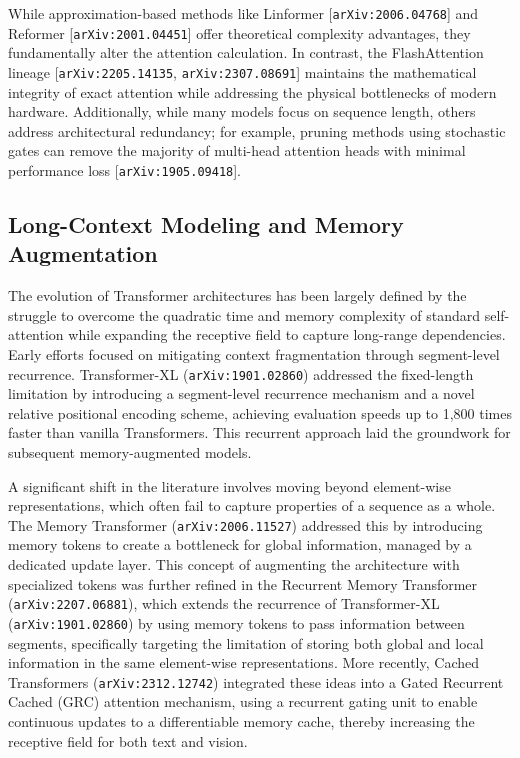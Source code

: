 \documentclass[11pt]{article}
\begin{document}
While approximation-based methods like Linformer [\texttt{arXiv:2006.04768}] and Reformer [\texttt{arXiv:2001.04451}] offer theoretical complexity advantages, they fundamentally alter the attention calculation. In contrast, the FlashAttention lineage [\texttt{arXiv:2205.14135}, \texttt{arXiv:2307.08691}] maintains the mathematical integrity of exact attention while addressing the physical bottlenecks of modern hardware. Additionally, while many models focus on sequence length, others address architectural redundancy; for example, pruning methods using stochastic gates can remove the majority of multi-head attention heads with minimal performance loss [\texttt{arXiv:1905.09418}].

\subsection{Long-Context Modeling and Memory Augmentation}

The evolution of Transformer architectures has been largely defined by the struggle to overcome the quadratic time and memory complexity of standard self-attention while expanding the receptive field to capture long-range dependencies. Early efforts focused on mitigating context fragmentation through segment-level recurrence. Transformer-XL (\texttt{arXiv:1901.02860}) addressed the fixed-length limitation by introducing a segment-level recurrence mechanism and a novel relative positional encoding scheme, achieving evaluation speeds up to 1,800 times faster than vanilla Transformers. This recurrent approach laid the groundwork for subsequent memory-augmented models.

A significant shift in the literature involves moving beyond element-wise representations, which often fail to capture properties of a sequence as a whole. The Memory Transformer (\texttt{arXiv:2006.11527}) addressed this by introducing memory tokens to create a bottleneck for global information, managed by a dedicated update layer. This concept of augmenting the architecture with specialized tokens was further refined in the Recurrent Memory Transformer (\texttt{arXiv:2207.06881}), which extends the recurrence of Transformer-XL (\texttt{arXiv:1901.02860}) by using memory tokens to pass information between segments, specifically targeting the limitation of storing both global and local information in the same element-wise representations. More recently, Cached Transformers (\texttt{arXiv:2312.12742}) integrated these ideas into a Gated Recurrent Cached (GRC) attention mechanism, using a recurrent gating unit to enable continuous updates to a differentiable memory cache, thereby increasing the receptive field for both text and vision.
\end{document}

